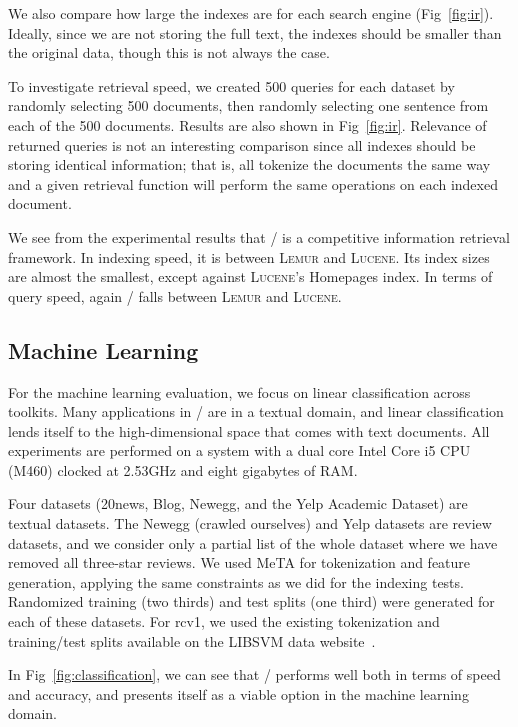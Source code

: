 We also compare how large the indexes are for each search engine
(Fig~\ref{fig:ir}). Ideally, since we are not storing the full text, the indexes
should be smaller than the original data, though this is not always the case.

To investigate retrieval speed, we created 500 queries for each dataset by
randomly selecting 500 documents, then randomly selecting one sentence from each
of the 500 documents. Results are also shown in Fig~\ref{fig:ir}. Relevance of
returned queries is not an interesting comparison since all indexes should be
storing identical information; that is, all tokenize the documents the same way
and a given retrieval function will perform the same operations on each indexed
document.

We see from the experimental results that \meta/ is a competitive information
retrieval framework. In indexing speed, it is between \textsc{Lemur} and
\textsc{Lucene}. Its index sizes are almost the smallest, except against
\textsc{Lucene}'s Homepages index. In terms of query speed, again \meta/ falls
between \textsc{Lemur} and \textsc{Lucene}.

\subsection{Machine Learning}

For the machine learning evaluation, we focus on linear classification across
toolkits. Many applications in \meta/ are in a textual domain, and linear
classification lends itself to the high-dimensional space that comes with text
documents. All experiments are performed on a system with a dual core Intel Core
i5 CPU (M460) clocked at 2.53GHz and eight gigabytes of RAM.

Four datasets (20news, Blog, Newegg, and the Yelp Academic
Dataset\footnotemark[10]) are textual datasets. The Newegg (crawled ourselves)
and Yelp datasets are review datasets, and we consider only a partial list of
the whole dataset where we have removed all three-star reviews. We used MeTA for
tokenization and feature generation, applying the same constraints as we did for
the indexing tests. Randomized training (two thirds) and test splits (one third)
were generated for each of these datasets. For rcv1, we used the existing
tokenization and training/test splits available on the LIBSVM data
website~\footnotemark[11].


In Fig~\ref{fig:classification}, we can see that \meta/ performs well both in
terms of speed and accuracy, and presents itself as a viable option in the
machine learning domain.




